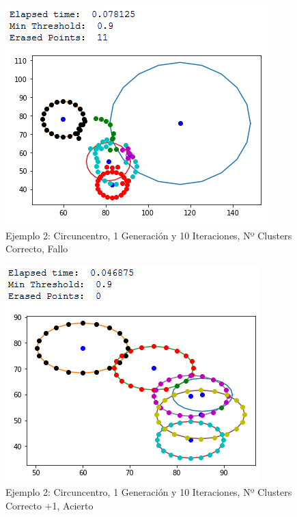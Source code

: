 \documentclass[conference,a4paper]{IEEEtran}
\begin{document}
\begin{figure}[H]
\centering
\includegraphics[scale=0.65]{Experimentacion/Ejemplo2/ej2_c_1_10_cc_wrong}
\caption{Ejemplo 2: Circuncentro, 1 Generación y 10 Iteraciones,  Nº Clusters Correcto, Fallo\\}
\end{figure}

\begin{figure}[H]
\centering
\includegraphics[scale=0.65]{Experimentacion/Ejemplo2/ej2_c_1_10_mc_correct}
\caption{Ejemplo 2: Circuncentro, 1 Generación y 10 Iteraciones,  Nº Clusters Correcto +1, Acierto\\}
\end{figure}
\end{document}
